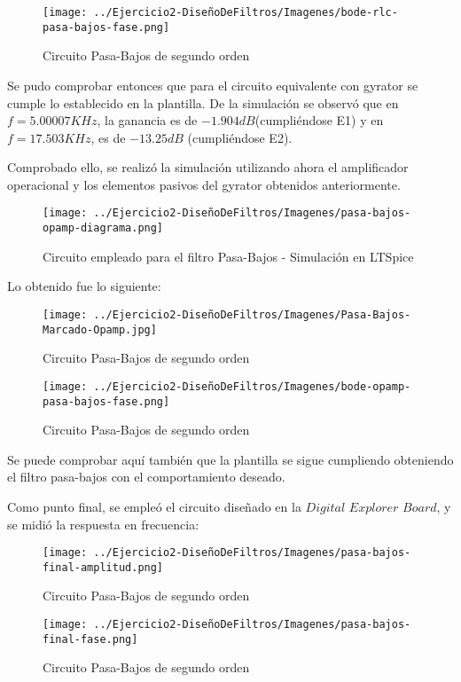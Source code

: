 \begin{figure}[H]
    \centering
    \texttt{[image: ../Ejercicio2-DiseñoDeFiltros/Imagenes/bode-rlc-pasa-bajos-fase.png]}
    \caption{Circuito Pasa-Bajos de segundo orden}
\end{figure}

Se pudo comprobar entonces que para el circuito equivalente con gyrator se cumple lo establecido en la plantilla.
De la simulación se observó que en $f=5.00007 KHz$, la ganancia es de $-1.904 dB$(cumpliéndose E1) y en $f=17.503KHz$, es de $-13.25 dB$
(cumpliéndose E2).


Comprobado ello, se realizó la simulación utilizando ahora el amplificador operacional y los elementos pasivos del gyrator obtenidos anteriormente.

\begin{figure}[H]
    \centering
    \texttt{[image: ../Ejercicio2-DiseñoDeFiltros/Imagenes/pasa-bajos-opamp-diagrama.png]}
    \caption{Circuito empleado para el filtro Pasa-Bajos - Simulación en LTSpice}
\end{figure}

Lo obtenido fue lo siguiente:

\begin{figure}[H]
    \centering
    \texttt{[image: ../Ejercicio2-DiseñoDeFiltros/Imagenes/Pasa-Bajos-Marcado-Opamp.jpg]}
    \caption{Circuito Pasa-Bajos de segundo orden}
\end{figure}

\begin{figure}[H]
    \centering
    \texttt{[image: ../Ejercicio2-DiseñoDeFiltros/Imagenes/bode-opamp-pasa-bajos-fase.png]}
    \caption{Circuito Pasa-Bajos de segundo orden}
\end{figure}

Se puede comprobar aquí también que la plantilla se sigue cumpliendo obteniendo el filtro pasa-bajos con el comportamiento deseado.

Como punto final, se empleó el circuito diseñado en la $Digital$ $Explorer$ $Board$, y se midió la respuesta en frecuencia:

\begin{figure}[H]
    \centering
    \texttt{[image: ../Ejercicio2-DiseñoDeFiltros/Imagenes/pasa-bajos-final-amplitud.png]}
    \caption{Circuito Pasa-Bajos de segundo orden}
\end{figure}

\begin{figure}[H]
    \centering
    \texttt{[image: ../Ejercicio2-DiseñoDeFiltros/Imagenes/pasa-bajos-final-fase.png]}
    \caption{Circuito Pasa-Bajos de segundo orden}
\end{figure}

